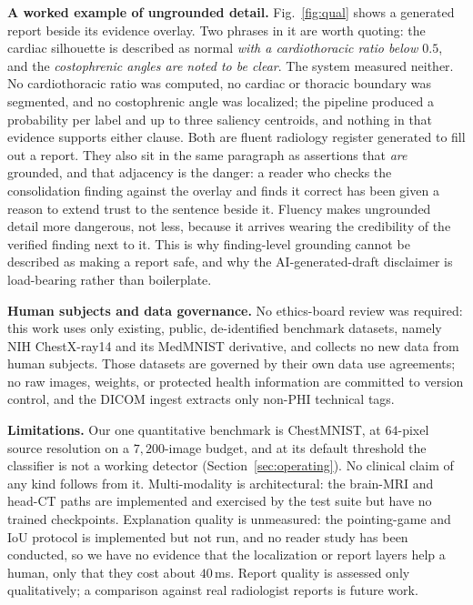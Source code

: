 \documentclass[conference]{IEEEtran}
\newcommand{\rih}[1]{\textbf{#1}\enspace\ignorespaces}
\begin{document}
\rih{A worked example of ungrounded detail.} Fig.~\ref{fig:qual} shows a generated
report beside its evidence overlay. Two phrases in it are worth quoting: the cardiac
silhouette is described as normal \emph{with a cardiothoracic ratio below $0.5$},
and the \emph{costophrenic angles are noted to be clear}. The system measured
neither. No cardiothoracic ratio was computed, no cardiac or thoracic boundary was
segmented, and no costophrenic angle was localized; the pipeline produced a
probability per label and up to three saliency centroids, and nothing in that
evidence supports either clause. Both are fluent radiology register generated to
fill out a report. They also sit in the same paragraph as assertions that \emph{are}
grounded, and that adjacency is the danger: a reader who checks the consolidation
finding against the overlay and finds it correct has been given a reason to extend
trust to the sentence beside it. Fluency makes ungrounded detail more dangerous, not
less, because it arrives wearing the credibility of the verified finding next to it.
This is why finding-level grounding cannot be described as making a report safe, and
why the AI-generated-draft disclaimer is load-bearing rather than boilerplate.

\rih{Human subjects and data governance.} No ethics-board review was required: this
work uses only existing, public, de-identified benchmark datasets, namely NIH
ChestX-ray14 and its MedMNIST derivative, and collects no new data from human
subjects. Those datasets are governed by their own data use agreements; no raw
images, weights, or protected health information are committed to version control,
and the DICOM ingest extracts only non-PHI technical tags.

\rih{Limitations.} Our one quantitative benchmark is ChestMNIST, at $64$-pixel
source resolution on a $7{,}200$-image budget, and at its default threshold the
classifier is not a working detector (Section~\ref{sec:operating}). No clinical
claim of any kind follows from it. Multi-modality is architectural: the brain-MRI
and head-CT paths are implemented and exercised by the test suite but have no
trained checkpoints. Explanation quality is unmeasured: the pointing-game and IoU
protocol is implemented but not run, and no reader study has been conducted, so we
have no evidence that the localization or report layers help a human, only that they
cost about $40$\,ms. Report quality is assessed only qualitatively; a comparison
against real radiologist reports is future work.

\end{document}
